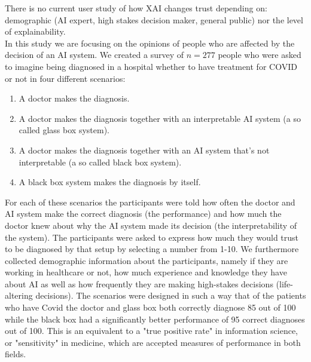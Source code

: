 \documentclass[manuscript,screen,review]{acmart}
\begin{document}
There is no current user study of how XAI changes trust depending on: demographic (AI expert, high stakes decision maker, general public) nor the level of explainability.\\  

In this study we are focusing on the opinions of people who are affected by the decision of an AI system. We created a survey of $n=277$ people who were asked to imagine being diagnosed in a hospital whether to have treatment for COVID or not in four different scenarios:

\begin{enumerate}
    \item A doctor makes the diagnosis.
    \item A doctor makes the diagnosis together with an interpretable AI system (a so called glass box system).
    \item A doctor makes the diagnosis together with an AI system that’s not interpretable (a so called black box system).
    \item A black box system makes the diagnosis by itself.
\end{enumerate}

For each of these scenarios the participants were told how often the doctor and AI system make the correct diagnosis (the performance) and how much the doctor knew about why the AI system made its decision (the interpretability of the system). The participants were asked to express how much they would trust to be diagnosed by that setup by selecting a number from 1-10. We furthermore collected demographic information about the participants, namely if they are working in healthcare or not, how much experience and knowledge they have about AI as well as how frequently they are making high-stakes decisions (life-altering decisions). The scenarios were designed in such a way that of the patients who have Covid the doctor and glass box both correctly diagnose 85 out of 100 while the black box had a significantly better performance of 95 correct diagnoses out of 100. This is an equivalent to a "true positive rate" in information science, or "sensitivity" in medicine, which are accepted measures of performance in both fields.
\end{document}

